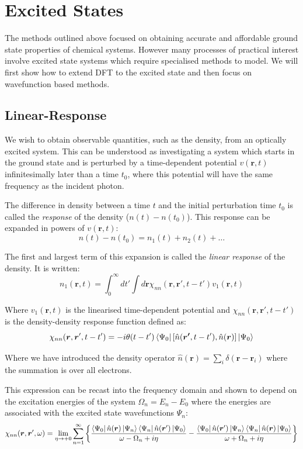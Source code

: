 \section{Excited States}
\label{sec:excited}
The methods outlined above focused on obtaining accurate and affordable ground state properties of chemical systems. However many processes of practical interest involve excited state systems which require specialised methods to model. We will first show how to extend DFT to the excited state and then focus on wavefunction based methods.

\subsection{Linear-Response}

We wish to obtain observable quantities, such as the density, from an optically excited system. This can be understood as investigating a system which starts in the ground state and is perturbed by a time-dependent potential $v(\bm{r},t)$ infinitesimally later than a time $t_0$, where this potential will have the same frequency as the incident photon.

The difference in density between a time $t$ and the initial perturbation time $t_0$ is called the \textit{response} of the density ($n(t)-n(t_0)$). This response can be expanded in powers of $v(\bm{r},t)$:
\begin{equation}
    n(t)-n(t_0) = n_1(t) + n_2(t) + \ldots
\end{equation}

The first and largest term of this expansion is called the \textit{linear response} of the density. It is written:
\begin{equation}
    n_1(\bm{r},t) = \int^{\infty}_{0} dt' \int d\bm{r}  \chi_{nn}(\bm{r},\bm{r}',t-t') v_1(\bm{r},t)
\end{equation}

Where $v_1(\bm{r},t)$ is the linearised time-dependent potential and $\chi_{nn}(\bm{r},\bm{r}',t-t')$ is the density-density response function defined as:
\begin{equation}
    \chi_{nn}(\bm{r},\bm{r}',t-t') = -i\theta(t-t')\bra{\Psi_0}[\hat{n}(\bm{r'},t-t'),\hat{n}(\bm{r})]\ket{\Psi_0}
\end{equation}

Where we have introduced the density operator $\hat{n}(\bm{r}) = \sum_i \delta(\bm{r}-\bm{r}_i)$ where the summation is over all electrons.

This expression can be recast into the frequency domain and shown to depend on the excitation energies of the system $\Omega_n = E_n - E_0$ where the energies are associated with the excited state wavefunctions $\Psi_n$:
\begin{equation}
    \chi_{nn}(\bm{r},\bm{r}',\omega) = \lim_{\eta\to+0} \sum^{\infty}_{n=1} \left\{ 
    \frac{\bra{\Psi_0}\hat{n}(\bm{r})\ket{\Psi_n} \bra{\Psi_n}\hat{n}(\bm{r}')\ket{\Psi_0}}{\omega - \Omega_n + i\eta}
    -
    \frac{\bra{\Psi_0}\hat{n}(\bm{r}')\ket{\Psi_n} \bra{\Psi_n}\hat{n}(\bm{r})\ket{\Psi_0}}{\omega + \Omega_n + i\eta}
    \right\}
    \label{eq:lehmann}
\end{equation}


